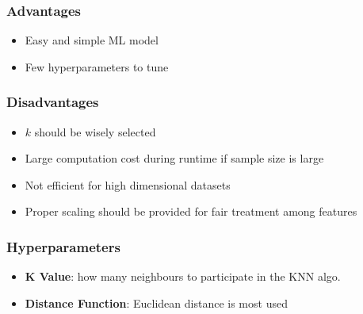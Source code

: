 \subsubsection{Advantages}
\begin{itemize}
    \item Easy and simple ML model
    \item Few hyperparameters to tune
\end{itemize}

\subsubsection{Disadvantages}
\begin{itemize}
    \item $k$ should be wisely selected
    \item Large computation cost during runtime if sample size is large
    \item Not efficient for high dimensional datasets
    \item Proper scaling should be provided for fair treatment among features
\end{itemize}

\subsubsection{Hyperparameters}
\begin{itemize}
    \item \textbf{K Value}: how many neighbours to participate in the KNN algo.
    \item \textbf{Distance Function}: Euclidean distance is most used
\end{itemize}